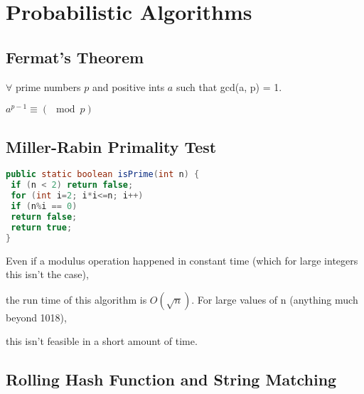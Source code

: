 \section{Probabilistic Algorithms}
\subsection*{Fermat's Theorem}

$\forall$ prime numbers $p$ and positive ints $a$ such that gcd(a, p) = 1.

$a^{p-1}\equiv(\mod p)$

\subsection*{Miller-Rabin Primality Test}

\begin{lstlisting}[language=Java,basicstyle=\tiny]
public static boolean isPrime(int n) {
 if (n < 2) return false;
 for (int i=2; i*i<=n; i++)
 if (n%i == 0)
 return false;
 return true;
}
\end{lstlisting}

Even if a modulus operation happened in constant time (which for large integers this isn’t the
case),

the run time of this algorithm is $O(\sqrt{n})$. For large values of n (anything much beyond 1018),

this isn’t feasible in a short amount of time.

\subsection*{Rolling Hash Function and String Matching}
\lipsum[1][1-2]
